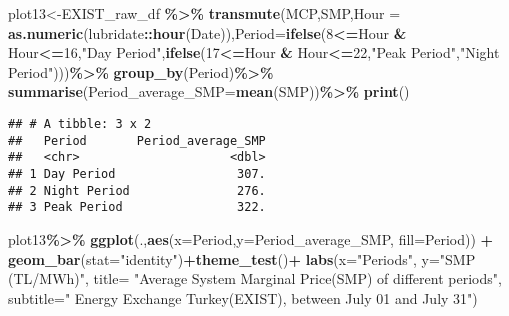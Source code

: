 \documentclass[
]{article}
\newenvironment{Shaded}{\begin{snugshade}}{\end{snugshade}}
\newcommand{\DataTypeTok}[1]{\textcolor[rgb]{0.13,0.29,0.53}{#1}}
\newcommand{\DecValTok}[1]{\textcolor[rgb]{0.00,0.00,0.81}{#1}}
\newcommand{\KeywordTok}[1]{\textcolor[rgb]{0.13,0.29,0.53}{\textbf{#1}}}
\newcommand{\NormalTok}[1]{#1}
\newcommand{\OperatorTok}[1]{\textcolor[rgb]{0.81,0.36,0.00}{\textbf{#1}}}
\newcommand{\StringTok}[1]{\textcolor[rgb]{0.31,0.60,0.02}{#1}}
\begin{document}
\begin{Shaded}
\begin{Highlighting}[]
\NormalTok{plot13\textless{}{-}EXIST\_raw\_df }\OperatorTok{\%\textgreater{}\%}\StringTok{ }
\KeywordTok{transmute}\NormalTok{(MCP,SMP,}\DataTypeTok{Hour =} \KeywordTok{as.numeric}\NormalTok{(lubridate}\OperatorTok{::}\KeywordTok{hour}\NormalTok{(Date)),}\DataTypeTok{Period=}\KeywordTok{ifelse}\NormalTok{(}\DecValTok{8}\OperatorTok{\textless{}=}\NormalTok{Hour }\OperatorTok{\&}\StringTok{ }\NormalTok{Hour}\OperatorTok{\textless{}=}\DecValTok{16}\NormalTok{,}\StringTok{"Day Period"}\NormalTok{,}\KeywordTok{ifelse}\NormalTok{(}\DecValTok{17}\OperatorTok{\textless{}=}\NormalTok{Hour }\OperatorTok{\&}\StringTok{ }\NormalTok{Hour}\OperatorTok{\textless{}=}\DecValTok{22}\NormalTok{,}\StringTok{"Peak Period"}\NormalTok{,}\StringTok{"Night Period"}\NormalTok{)))}\OperatorTok{\%\textgreater{}\%}\StringTok{  }\KeywordTok{group\_by}\NormalTok{(Period)}\OperatorTok{\%\textgreater{}\%}\StringTok{ }\KeywordTok{summarise}\NormalTok{(}\DataTypeTok{Period\_average\_SMP=}\KeywordTok{mean}\NormalTok{(SMP))}\OperatorTok{\%\textgreater{}\%}\StringTok{ }\KeywordTok{print}\NormalTok{()}
\end{Highlighting}
\end{Shaded}

\begin{verbatim}
## # A tibble: 3 x 2
##   Period       Period_average_SMP
##   <chr>                     <dbl>
## 1 Day Period                 307.
## 2 Night Period               276.
## 3 Peak Period                322.
\end{verbatim}

\begin{Shaded}
\begin{Highlighting}[]
\NormalTok{plot13}\OperatorTok{\%\textgreater{}\%}\StringTok{ }\KeywordTok{ggplot}\NormalTok{(.,}\KeywordTok{aes}\NormalTok{(}\DataTypeTok{x=}\NormalTok{Period,}\DataTypeTok{y=}\NormalTok{Period\_average\_SMP, }\DataTypeTok{fill=}\NormalTok{Period)) }\OperatorTok{+}\StringTok{ }\KeywordTok{geom\_bar}\NormalTok{(}\DataTypeTok{stat=}\StringTok{"identity"}\NormalTok{)}\OperatorTok{+}\KeywordTok{theme\_test}\NormalTok{()}\OperatorTok{+}
\StringTok{       }\KeywordTok{labs}\NormalTok{(}\DataTypeTok{x=}\StringTok{"Periods"}\NormalTok{, }\DataTypeTok{y=}\StringTok{"SMP (TL/MWh)"}\NormalTok{, }
            \DataTypeTok{title=}  \StringTok{"Average System Marginal Price(SMP) of different periods"}\NormalTok{,}
            \DataTypeTok{subtitle=}\StringTok{" Energy Exchange Turkey(EXIST), between July 01 and July 31"}\NormalTok{)}
\end{Highlighting}
\end{Shaded}
\end{document}
